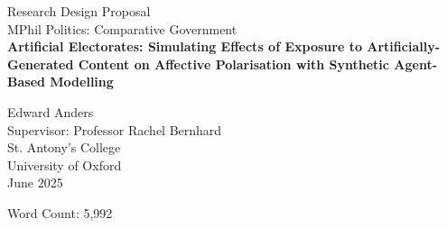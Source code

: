 \begin{titlepage}
\thispagestyle{empty}
\centering
\vspace*{6em}

{\LARGE  Research Design Proposal\\[1em]}
{\LARGE MPhil Politics: Comparative Government \\[2em]}
{\Large \textbf{Artificial Electorates: Simulating Effects of Exposure to Artificially-Generated Content on Affective Polarisation with Synthetic Agent-Based Modelling}\\[2em]}


{\Large Edward Anders \\[0.5em]}
Supervisor: Professor Rachel Bernhard \\[1em]
St. Antony's College \\
University of Oxford \\[1em]

June 2025

Word Count: 5,992

\vfill

\end{titlepage}
\newpage